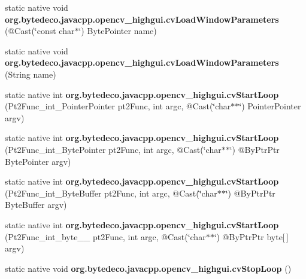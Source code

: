 \begin{DoxyCompactItemize}
\mbox{\label{group__highgui__c_gaa1f79b71a312aad19505a4dc714045c2}} 
static native void {\bfseries org.\+bytedeco.\+javacpp.\+opencv\+\_\+highgui.\+cv\+Load\+Window\+Parameters} (@Cast(\char`\"{}const char$\ast$\char`\"{}) Byte\+Pointer name)
\item 
\mbox{\label{group__highgui__c_ga3635fb46c1653be2888a471d533dc5a5}} 
static native void {\bfseries org.\+bytedeco.\+javacpp.\+opencv\+\_\+highgui.\+cv\+Load\+Window\+Parameters} (String name)
\item 
\mbox{\label{group__highgui__c_gab05449bd84afae67ffea115ad3e02404}} 
static native int {\bfseries org.\+bytedeco.\+javacpp.\+opencv\+\_\+highgui.\+cv\+Start\+Loop} (Pt2\+Func\+\_\+int\+\_\+\+Pointer\+Pointer pt2\+Func, int argc, @Cast(\char`\"{}char$\ast$$\ast$\char`\"{}) Pointer\+Pointer argv)
\item 
\mbox{\label{group__highgui__c_ga275cab30849ad21d136f319fb1225a13}} 
static native int {\bfseries org.\+bytedeco.\+javacpp.\+opencv\+\_\+highgui.\+cv\+Start\+Loop} (Pt2\+Func\+\_\+int\+\_\+\+Byte\+Pointer pt2\+Func, int argc, @Cast(\char`\"{}char$\ast$$\ast$\char`\"{}) @By\+Ptr\+Ptr Byte\+Pointer argv)
\item 
\mbox{\label{group__highgui__c_ga2dbf2d9ec08c08f8ed0ce9f3c1248d49}} 
static native int {\bfseries org.\+bytedeco.\+javacpp.\+opencv\+\_\+highgui.\+cv\+Start\+Loop} (Pt2\+Func\+\_\+int\+\_\+\+Byte\+Buffer pt2\+Func, int argc, @Cast(\char`\"{}char$\ast$$\ast$\char`\"{}) @By\+Ptr\+Ptr Byte\+Buffer argv)
\item 
\mbox{\label{group__highgui__c_gaf06e2c98e14e4223c9e4ccc74882903f}} 
static native int {\bfseries org.\+bytedeco.\+javacpp.\+opencv\+\_\+highgui.\+cv\+Start\+Loop} (Pt2\+Func\+\_\+int\+\_\+byte\+\_\+\+\_\+ pt2\+Func, int argc, @Cast(\char`\"{}char$\ast$$\ast$\char`\"{}) @By\+Ptr\+Ptr byte\mbox{[}$\,$\mbox{]} argv)
\item 
\mbox{\label{group__highgui__c_ga8d069e867b993ee75607afa9cdc986d6}} 
static native void {\bfseries org.\+bytedeco.\+javacpp.\+opencv\+\_\+highgui.\+cv\+Stop\+Loop} ()
\item 

\end{DoxyCompactItemize}
